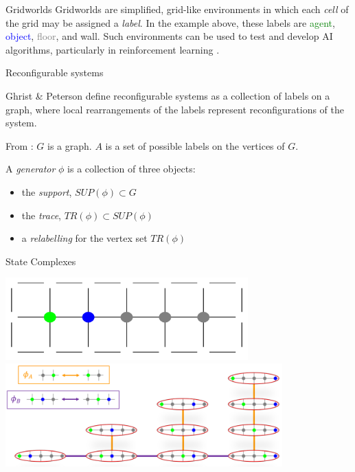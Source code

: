 \documentclass[a0paper,landscape, fontscale=0.4]{baposter}
\begin{document}
\begin{poster}
\begin{posterbox}[name=grid,below=abstract]{Gridworlds}
Gridworlds are simplified, grid-like environments in which each \textit{cell} of the grid may be assigned a \textit{label}. In the example above, these labels are \textcolor{green}{agent}, \textcolor{blue}{object}, \textcolor{gray}{floor}, and wall. Such environments can be used to test and develop AI algorithms, particularly in reinforcement learning \cite{Leike:2017}.
\end{posterbox}



\begin{posterbox}[name=reconfigsys,below=grid]{Reconfigurable systems}

Ghrist \& Peterson \cite{Ghrist-Peterson:2007} define reconfigurable systems as a collection of labels on a graph, where local rearrangements of the labels represent reconfigurations of the system.
\vspace{0.15cm}

From \cite{Ghrist-Peterson:2007}: $G$ is a graph. $A$ is a set of possible labels on the vertices of $G$.

A \textit{generator} $\phi$ is a collection of three objects:
\begin{itemize}
    \item the \textit{support}, $SUP(\phi) \subset G$
    \item the \textit{trace}, $TR(\phi) \subset SUP(\phi)$
    \item a \textit{relabelling} for the vertex set $TR(\phi)$
\end{itemize}
\end{posterbox}



\begin{posterbox}[name=scs,below=reconfigsys,bottomaligned=message]{State Complexes}
\begin{center}
\includegraphics[width=0.7\textwidth]{coorridor.PNG}
\includegraphics[width=0.8\textwidth]{SC-example.PNG}
\end{center}


\end{posterbox}
\end{poster}
\end{document}
